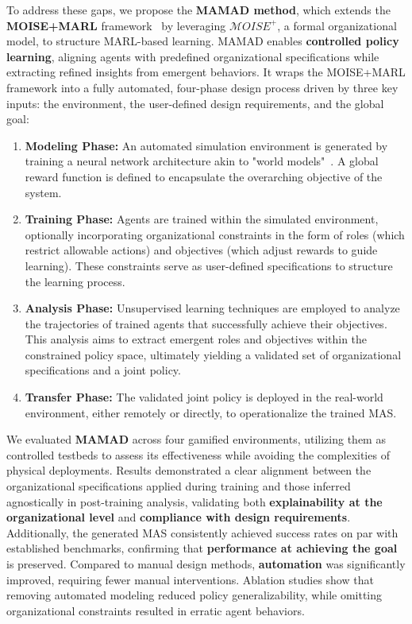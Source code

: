 \documentclass[pdflatex,sn-mathphys-num]{sn-jnl}%
\theoremstyle{thmstyleone}%
\theoremstyle{thmstyletwo}%
\theoremstyle{thmstylethree}%
\begin{document}
To address these gaps, we propose the \textbf{MAMAD method}, which extends the \textbf{MOISE+MARL} framework~\cite{soule2025moisemarl} by leveraging \textbf{$\mathcal{M}OISE^+$}, a formal organizational model, to structure MARL-based learning. MAMAD enables \textbf{controlled policy learning}, aligning agents with predefined organizational specifications while extracting refined insights from emergent behaviors. It wraps the MOISE+MARL framework into a fully automated, four-phase design process driven by three key inputs: the environment, the user-defined design requirements, and the global goal:
%
\begin{enumerate}
  \item \textbf{Modeling Phase:} An automated simulation environment is generated by training a neural network architecture akin to "world models"~\cite{Ha2018}. A global reward function is defined to encapsulate the overarching objective of the system.
  \item \textbf{Training Phase:} Agents are trained within the simulated environment, optionally incorporating organizational constraints in the form of roles (which restrict allowable actions) and objectives (which adjust rewards to guide learning). These constraints serve as user-defined specifications to structure the learning process.
  \item \textbf{Analysis Phase:} Unsupervised learning techniques are employed to analyze the trajectories of trained agents that successfully achieve their objectives. This analysis aims to extract emergent roles and objectives within the constrained policy space, ultimately yielding a validated set of organizational specifications and a joint policy.
  \item \textbf{Transfer Phase:} The validated joint policy is deployed in the real-world environment, either remotely or directly, to operationalize the trained MAS.
\end{enumerate}
%
We evaluated \textbf{MAMAD} across four gamified environments, utilizing them as controlled testbeds to assess its effectiveness while avoiding the complexities of physical deployments. Results demonstrated a clear alignment between the organizational specifications applied during training and those inferred agnostically in post-training analysis, validating both \textbf{explainability at the organizational level} and \textbf{compliance with design requirements}. Additionally, the generated MAS consistently achieved success rates on par with established benchmarks, confirming that \textbf{performance at achieving the goal} is preserved. Compared to manual design methods, \textbf{automation} was significantly improved, requiring fewer manual interventions. Ablation studies show that removing automated modeling reduced policy generalizability, while omitting organizational constraints resulted in erratic agent behaviors.
\end{document}
